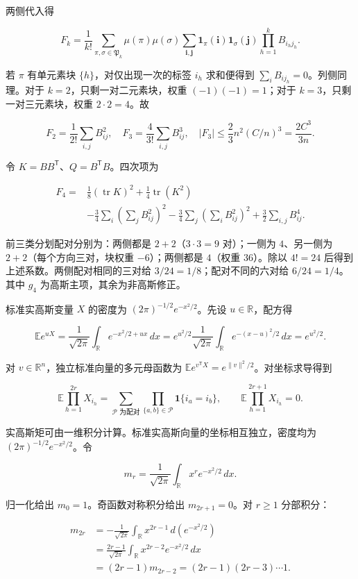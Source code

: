 \documentclass[11pt,a4paper]{article}
\begin{document}
两侧代入得

\[
F_k=\frac1{k!}\sum_{\pi,\sigma\in\mathfrak P_k}\mu(\pi)\mu(\sigma)
\sum_{\boldsymbol i,\boldsymbol j}\mathbf1_\pi(\boldsymbol i)\mathbf1_\sigma(\boldsymbol j)
\prod_{h=1}^kB_{i_hj_h}.
\]

若 \(\pi\) 有单元素块 \(\{h\}\)，对仅出现一次的标签 \(i_h\) 求和便得到 \(\sum_iB_{ij_h}=0\)。列侧同理。对于 \(k=2\)，只剩一对二元素块，权重 \((-1)(-1)=1\)；对于 \(k=3\)，只剩一对三元素块，权重 \(2\cdot2=4\)。故

\[
F_2=\frac1{2!}\sum_{i,j}B_{ij}^2,\quad
F_3=\frac4{3!}\sum_{i,j}B_{ij}^3,\quad
|F_3|\le\frac23n^2(C/n)^3=\frac{2C^3}{3n}.
\]

令 \(K=BB^{\mathsf T}\)、\(Q=B^{\mathsf T}B\)。四次项为

\[
\begin{aligned}
F_4={}&\frac18(\operatorname{tr}K)^2+\frac14\operatorname{tr}(K^2)\\
&-\frac34\sum_i\left(\sum_jB_{ij}^2\right)^2
-\frac34\sum_j\left(\sum_iB_{ij}^2\right)^2
+\frac32\sum_{i,j}B_{ij}^4.
\end{aligned}
\]

前三类分划配对分别为：两侧都是 \(2+2\)（\(3\cdot3=9\) 对）；一侧为 \(4\)、另一侧为 \(2+2\)（每个方向三对，块权重 \(-6\)）；两侧都是 \(4\)（权重 \(36\)）。除以 \(4!=24\) 后得到上述系数。两侧配对相同的三对给 \(3/24=1/8\)；配对不同的六对给 \(6/24=1/4\)。其中 \(g_4\) 为高斯主项，其余为非高斯修正。

标准实高斯变量 \(X\) 的密度为 \((2\pi)^{-1/2}e^{-x^2/2}\)。先设 \(u\in\mathbb R\)，配方得

\[
\mathbb Ee^{uX}=\frac1{\sqrt{2\pi}}\int_{\mathbb R}e^{-x^2/2+ux}\,dx
=e^{u^2/2}\frac1{\sqrt{2\pi}}\int_{\mathbb R}e^{-(x-u)^2/2}\,dx=e^{u^2/2}.
\]

对 \(v\in\mathbb R^n\)，独立标准向量的多元母函数为 \(\mathbb Ee^{v^{\mathsf T}X}=e^{\|v\|^2/2}\)。对坐标求导得到

\[
\mathbb E\prod_{h=1}^{2r}X_{i_h}
=\sum_{\mathcal P\text{ 为配对}}\prod_{\{a,b\}\in\mathcal P}\mathbf1\{i_a=i_b\},
\qquad \mathbb E\prod_{h=1}^{2r+1}X_{i_h}=0.
\]

实高斯矩可由一维积分计算。标准实高斯向量的坐标相互独立，密度均为 \((2\pi)^{-1/2}e^{-x^2/2}\)。令

\[
m_r=\frac1{\sqrt{2\pi}}\int_{\mathbb R}x^re^{-x^2/2}\,dx.
\]

归一化给出 \(m_0=1\)。奇函数对称积分给出 \(m_{2r+1}=0\)。对 \(r\ge1\) 分部积分：

\[
\begin{aligned}
m_{2r}
&=-\frac1{\sqrt{2\pi}}\int_{\mathbb R}x^{2r-1}\,d(e^{-x^2/2})\\
&=\frac{2r-1}{\sqrt{2\pi}}\int_{\mathbb R}x^{2r-2}e^{-x^2/2}\,dx\\
&=(2r-1)m_{2r-2}
=(2r-1)(2r-3)\cdots1.
\end{aligned}
\]
\end{document}

